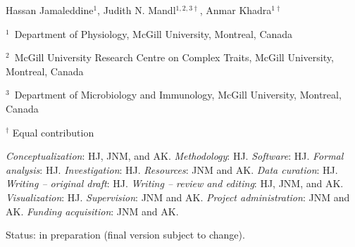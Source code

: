 \hspace*{0.25in}%
\begin{minipage}{6in}
    \setlength{\parskip}{1pt}
    \vspace{6pt}
    Hassan Jamaleddine$^{1}$, Judith N. Mandl$^{1,2,3 \dagger }$, Anmar Khadra$^{1 \dagger }$

    \vspace{6pt}
    
    {\small $^1$~Department of Physiology, McGill University, Montreal, Canada \par $^2$~McGill University Research Centre on Complex Traits, McGill University, Montreal, Canada \par $^3$~Department of Microbiology and Immunology, McGill University, Montreal, Canada \par $^{\dagger}$ Equal contribution}

    \vspace{6pt}
    
    \textit{Conceptualization}: HJ, JNM, and AK. \textit{Methodology}: HJ. \textit{Software}: HJ. \textit{Formal analysis}: HJ. \textit{Investigation}: HJ. \textit{Resources}: JNM and AK. \textit{Data curation}: HJ. \textit{Writing -- original draft}: HJ. \textit{Writing – review and editing}: HJ, JNM, and AK. \textit{Visualization}: HJ. \textit{Supervision}: JNM and AK. \textit{Project administration}: JNM and AK. \textit{Funding acquisition}: JNM and AK.

    \vspace{6pt}

    Status: in preparation (final version subject to change).
\end{minipage}

\setlength{\parindent}{16pt}
\setlength{\parskip}{6pt}